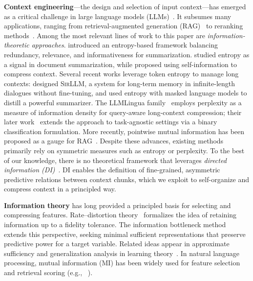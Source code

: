 \documentclass{article} %
\theoremstyle{definition}
\begin{document}
\textbf{Context engineering}---the design and selection of input context---has emerged as a critical challenge in large language models (LLMs)~\citep{mei2025surveycontextengineeringlarge}. It subsumes many applications, ranging from retrieval-augmented generation (RAG)~\citep{lewis2020retrieval} to reranking methods~\citep{carbonell1998mmr,nogueira2019passage,li2020parade}. Among the most relevant lines of work to this paper are \emph{information-theoretic approaches}. \citet{peyrard2019simple} introduced an entropy-based framework balancing redundancy, relevance, and informativeness for summarization. \citet{khurana2022investigating} studied entropy as a signal in document summarization, while \citet{li2023compressing} proposed using self-information to compress context. Several recent works leverage token entropy to manage long contexts: \citet{yao2024sirllm} designed \textsc{SirLLM}, a system for long-term memory in infinite-length dialogues without fine-tuning, and \citet{junginformation} used entropy with masked language models to distill a powerful summarizer. The LLMLingua family~\citep{jiang2023llmlingua,jiang2024longllmlingua} employs perplexity as a measure of information density for query-aware long-context compression; their later work~\citep{pan2024llmlingua} extends the approach to task-agnostic settings via a binary classification formulation. More recently, pointwise mutual information has been proposed as a gauge for RAG~\citep{liu-etal-2025-pointwise}. Despite these advances, existing methods primarily rely on symmetric measures such as entropy or perplexity. To the best of our knowledge, there is no theoretical framework that leverages \emph{directed information (DI)}~\citep{massey1990causality,kim2008coding}. DI enables the definition of fine-grained, asymmetric predictive relations between context chunks, which we exploit to self-organize and compress context in a principled way.

\textbf{Information theory} has long provided a principled basis for selecting and compressing features. 
Rate--distortion theory~\citep{shannon1959coding} formalizes the idea of retaining information up to a fidelity tolerance. 
The information bottleneck method~\citep{tishby1999information,strouse2017information} extends this perspective, seeking minimal sufficient representations that preserve predictive power for a target variable. 
Related ideas appear in approximate sufficiency and generalization analysis in learning theory~\citep{xu2017information}. 
In natural language processing, mutual information (MI) has been widely used for feature selection and retrieval scoring (e.g., ~\citet{liu-etal-2025-pointwise}).
\end{document}

